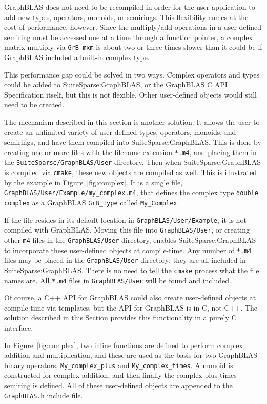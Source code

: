 \documentclass[12pt]{article}
\begin{document}
GraphBLAS does not need to be recompiled in order for the user application to
add new types, operators, monoids, or semirings.  This flexibility comes at the
cost of performance, however.  Since the multiply/add operations in a
user-defined semiring must be accessed one at a time through a function
pointer, a complex matrix multiply via \verb'GrB_mxm' is about two or three
times slower than it could be if GraphBLAS included a built-in complex type.

This performance gap could be solved in two ways.  Complex operators and types
could be added to SuiteSparse:GraphBLAS, or the GraphBLAS C API
Specification itself, but this is not flexible.  Other user-defined objects
would still need to be created.

The mechanism described in this section is another solution.  It allows the
user to create an unlimited variety of user-defined types, operators, monoids,
and semirings, and have them compiled into SuiteSparse:GraphBLAS.  This is done
by creating one or more files with the filename extension \verb'*.m4', and
placing them in the \verb'SuiteSparse/GraphBLAS/User' directory.  Then when
SuiteSparse:GraphBLAS is compiled via \verb'cmake', these new objects are
compiled as well.  This is illustrated by the example in
Figure~\ref{fig:complex}.  It is a single file,
\verb'GraphBLAS/User/Example/my_complex.m4', that defines the complex type
\verb'double complex' as a GraphBLAS \verb'GrB_Type' called \verb'My_Complex'.

If the file resides in its default location in \verb'GraphBLAS/User/Example',
it is not compiled with GraphBLAS.  Moving this file into
\verb'GraphBLAS/User', or creating other \verb'm4' files in the
\verb'GraphBLAS/User' directory, enables SuiteSparse:GraphBLAS to incorporate
these user-defined objects at compile-time.  Any number of \verb'*.m4' files
may be placed in the \verb'GraphBLAS/User' directory; they are all included in
SuiteSparse:GraphBLAS.  There is no need to tell the \verb'cmake' process what
the file names are.  All \verb'*.m4' files in \verb'GraphBLAS/User' will be
found and included.

Of course, a C++ API for GraphBLAS could also create user-defined objects at
compile-time via templates, but the API for GraphBLAS is in C, not C++.  The
solution described in this Section provides this functionality in a purely C
interface.

In Figure~\ref{fig:complex}, two inline functions are defined to perform
complex addition and multiplication, and these are used as the basis for two
GraphBLAS binary operators, \verb'My_complex_plus' and \verb'My_complex_times'.
A monoid is constructed for complex addition, and then finally the complex
plus-times semiring is defined.  All of these user-defined objects are appended
to the \verb'GraphBLAS.h' include file.
\end{document}
